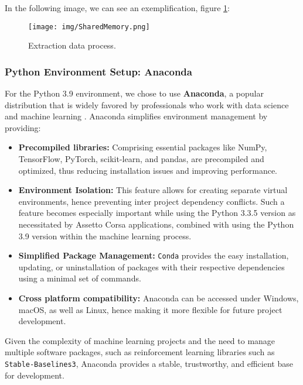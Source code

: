 \documentclass[a4paper,final,12pt]{report}
\begin{document}
In the following image, we can see an exemplification, figure \ref{figura:extractionData}:

\begin{figure}[hbtp]
\centering
\texttt{[image: img/SharedMemory.png]}
\caption{Extraction data process.}
\label{figura:extractionData}
\end{figure}


\subsubsection{Python Environment Setup: Anaconda}
For the Python 3.9 environment, we chose to use \textbf{Anaconda},  a popular distribution that is widely favored by professionals who work with data science and machine learning \cite{anaconda2025}.
Anaconda simplifies environment management by providing:

\begin{itemize}
    \item \textbf{Precompiled libraries:} Comprising essential packages like NumPy, TensorFlow, PyTorch, scikit-learn, and pandas, are precompiled and optimized, thus reducing installation issues and improving performance.
    \item \textbf{Environment Isolation:} This feature allows for creating separate virtual environments, hence preventing inter project dependency conflicts. Such a feature becomes especially important while using the Python 3.3.5 version as necessitated by Assetto Corsa applications, combined with using the Python 3.9 version within the machine learning process.
    \item \textbf{Simplified Package Management:} \texttt{Conda} provides the easy installation, updating, or uninstallation of packages with their respective dependencies using a minimal set of commands.
    \item \textbf{Cross platform compatibility:} Anaconda can be accessed under Windows, macOS, as well as Linux, hence making it more flexible for future project development.
\end{itemize}
Given the complexity of machine learning projects and the need to manage multiple software packages, such as reinforcement learning libraries such as \texttt{Stable-Baselines3}, Anaconda provides a stable, trustworthy, and efficient base for development.
\end{document}
